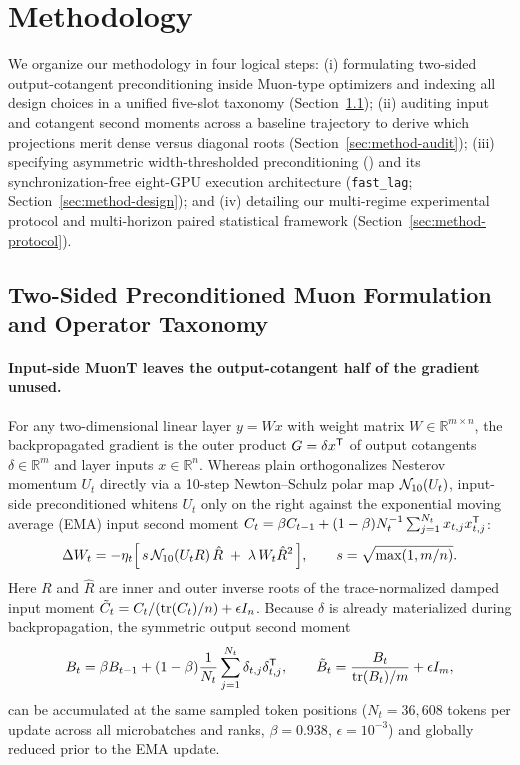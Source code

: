\section{Methodology}
\label{sec:method}

We organize our methodology in four logical steps: (i) formulating two-sided
output-cotangent preconditioning inside Muon-type optimizers and indexing all
design choices in a unified five-slot taxonomy (Section~\ref{sec:method-formulation});
(ii) auditing input and cotangent second moments across a baseline 
trajectory to derive which projections merit dense versus diagonal roots
(Section~\ref{sec:method-audit}); (iii) specifying asymmetric width-thresholded
preconditioning () and its synchronization-free eight-GPU
execution architecture (\texttt{fast\_lag}; Section~\ref{sec:method-design}); and
(iv) detailing our multi-regime experimental protocol and multi-horizon paired
statistical framework (Section~\ref{sec:method-protocol}).

\subsection{Two-Sided Preconditioned Muon Formulation and Operator Taxonomy}
\label{sec:method-formulation}

\paragraph{Input-side MuonT leaves the output-cotangent half of the gradient unused.}
For any two-dimensional linear layer $y = W x$ with weight matrix
$W \in \mathbb{R}^{m \times n}$, the backpropagated gradient is the outer
product $G = \delta x^{{\mathsf T}}$ of output cotangents $\delta \in \mathbb{R}^{m}$
and layer inputs $x \in \mathbb{R}^{n}$. Whereas plain 
\citep{jordan2024muon} orthogonalizes Nesterov momentum $U_t$ directly via a
10-step Newton--Schulz polar map $\mathcal{N}_{10}(U_t)$, input-side preconditioned
 whitens $U_t$ only on the right against the exponential moving
average (EMA) input second moment $C_t = \beta C_{t-1} + (1-\beta) N_t^{-1}\sum_{j=1}^{N_t} x_{t,j} x_{t,j}^{{\mathsf T}}$:
\begin{equation}
\label{eq:muont}
\Delta W_t = -\eta_t \Bigl[\, s\,\mathcal{N}_{10}(U_t R)\,\hat R \;+\; \lambda\,W_t \hat R^2 \,\Bigr],
\qquad s = \sqrt{\max(1, m/n)}.
\end{equation}
Here $R$ and $\hat R$ are inner and outer inverse roots of the trace-normalized
damped input moment $\tilde C_t = C_t / (\operatorname{tr}(C_t)/n) + \epsilon I_n$. Because
$\delta$ is already materialized during backpropagation, the symmetric output
second moment
\begin{equation}
\label{eq:B-moment}
B_t = \beta B_{t-1} + (1-\beta)\frac{1}{N_t}\sum_{j=1}^{N_t}\delta_{t,j}\delta_{t,j}^{{\mathsf T}},
\qquad \tilde B_t = \frac{B_t}{\operatorname{tr}(B_t)/m} + \epsilon I_m,
\end{equation}
can be accumulated at the same sampled token positions ($N_t = 36{,}608$ tokens
per update across all microbatches and ranks, $\beta = 0.938$, $\epsilon = 10^{-3}$)
and globally reduced prior to the EMA update.

